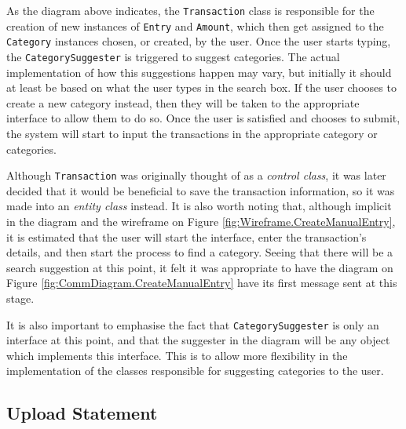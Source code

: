 As the diagram above indicates, the \texttt{Transaction} class is responsible for
the creation of new instances of \texttt{Entry} and \texttt{Amount}, which then get
assigned to the \texttt{Category} instances chosen, or created, by the user.
Once the user starts typing, the \texttt{CategorySuggester} is triggered to
suggest categories. The actual implementation of how this suggestions happen
may vary, but initially it should at least be based on what the user types in
the search box. If the user chooses to create a new category instead, then they
will be taken to the appropriate interface to allow them to do so. Once the
user is satisfied and chooses to submit, the system will start to input the
transactions in the appropriate category or categories.

Although \texttt{Transaction} was originally thought of as a \emph{control
class}, it was later decided that it would be beneficial to save the
transaction information, so it was made into an \emph{entity class} instead.
It is also worth noting that, although implicit in the diagram and the
wireframe on Figure \ref{fig:Wireframe.CreateManualEntry}, it is estimated that
the user will start the interface, enter the transaction's details, and then
start the process to find a category. Seeing that there will be a search
suggestion at this point, it felt it was appropriate to have the diagram on
Figure \ref{fig:CommDiagram.CreateManualEntry} have its first message sent at
this stage.

It is also important to emphasise the fact that \texttt{CategorySuggester} is
only an interface at this point, and that the suggester in the diagram will be
any object which implements this interface. This is to allow more flexibility
in the implementation of the classes responsible for suggesting categories to
the user.

\subsection{Upload Statement} \label{sec:AnalysisAndDesign.UploadStatement}

